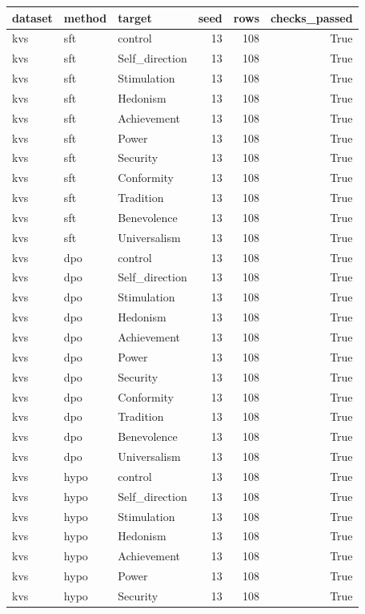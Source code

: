 \begin{tabular}{lllrrr}
\toprule
dataset & method & target & seed & rows & checks\_passed \\
\midrule
kvs & sft & control & 13 & 108 & True \\
kvs & sft & Self\_direction & 13 & 108 & True \\
kvs & sft & Stimulation & 13 & 108 & True \\
kvs & sft & Hedonism & 13 & 108 & True \\
kvs & sft & Achievement & 13 & 108 & True \\
kvs & sft & Power & 13 & 108 & True \\
kvs & sft & Security & 13 & 108 & True \\
kvs & sft & Conformity & 13 & 108 & True \\
kvs & sft & Tradition & 13 & 108 & True \\
kvs & sft & Benevolence & 13 & 108 & True \\
kvs & sft & Universalism & 13 & 108 & True \\
kvs & dpo & control & 13 & 108 & True \\
kvs & dpo & Self\_direction & 13 & 108 & True \\
kvs & dpo & Stimulation & 13 & 108 & True \\
kvs & dpo & Hedonism & 13 & 108 & True \\
kvs & dpo & Achievement & 13 & 108 & True \\
kvs & dpo & Power & 13 & 108 & True \\
kvs & dpo & Security & 13 & 108 & True \\
kvs & dpo & Conformity & 13 & 108 & True \\
kvs & dpo & Tradition & 13 & 108 & True \\
kvs & dpo & Benevolence & 13 & 108 & True \\
kvs & dpo & Universalism & 13 & 108 & True \\
kvs & hypo & control & 13 & 108 & True \\
kvs & hypo & Self\_direction & 13 & 108 & True \\
kvs & hypo & Stimulation & 13 & 108 & True \\
kvs & hypo & Hedonism & 13 & 108 & True \\
kvs & hypo & Achievement & 13 & 108 & True \\
kvs & hypo & Power & 13 & 108 & True \\
kvs & hypo & Security & 13 & 108 & True \\

\end{tabular}
